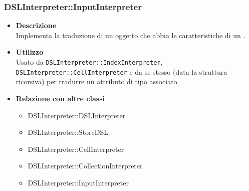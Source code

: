 \subsubsection{DSLInterpreter::InputInterpreter}
\begin{itemize}
\item \textbf{Descrizione} \hfill \\
  Implementa la traduzione di un oggetto che abbia le caratteristiche di un .
\item \textbf{Utilizzo} \hfill \\
  Usato da \texttt{DSLInterpreter::IndexInterpreter}, \texttt{DSLInterpreter::CellInterpreter} e da se stesso (data la struttura ricorsiva) per tradurre un attributo di tipo  associato.
\item \textbf{Relazione con altre classi}
  \begin{itemize}
  \item DSLInterpreter::DSLInterpreter
  \item DSLInterpreter::StoreDSL
  \item DSLInterpreter::CellInterpreter
  \item DSLInterpreter::CollectionInterpreter
  \item DSLInterpreter::InputInterpreter
  \end{itemize}
\end{itemize}
